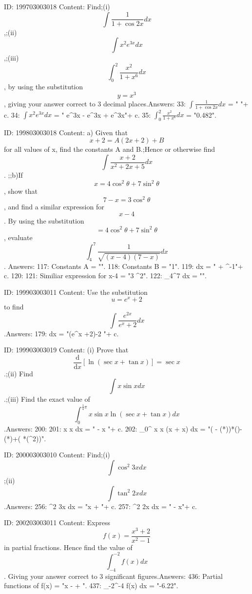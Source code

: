 \documentclass{article}
\begin{document}
ID: 199703003018
Content:
Find;(i) \[\int \frac {1}{1 + \cos 2x} dx\],;(ii) \[\int x^{2} e^{3x} dx\],;(iii)\[\int_{0}^{2} \frac {x^{2}}{1 + x^{6}} dx\], by using the substitution \[y = x^{3}\], giving your answer correct to 3 decimal places.Answers:
33: $\int \frac{1}{1+\cos 2x} dx$ = " "+ c.
34: $\int x^2 e^{3x} dx$ = " e^{3x} -  e^{3x} +  e^{3x}"+ c.
35: $\int_0^2 \frac{x^2}{1+x^6} dx$ = "0.482".

ID: 199803003018
Content:
a)  Given that $$x + 2 = A (2x + 2) + B$$ for all values of x, find the constants A and B.;Hence or otherwise find $$\int \frac{x + 2}{x^2 + 2x + 5} dx$$. ;;b)If  $$x = 4 {\cos}^2 \theta + 7 {\sin}^2 \theta$$, show that $$7 - x = 3 {\cos}^2 \theta$$, and find a similar expression for $$x - 4$$. By using the substitution $$= 4 {\cos}^2 \theta + 7 {\sin}^2 \theta$$, evaluate $$\int^7_4 \frac{1}{\sqrt{{ ( x - 4 ) ( 7 - x ) }}} dx$$. Answers:
117: Constants A = "".
118: Constants B = "1".
119: \int {} dx = "  +  \tan^{-1}{}"+ c.
120: 
121: Similiar expression for x-4 = "3 \sin^{2}{\theta}".
122: \int_4^7  dx = "\pi".

ID: 199903003011
Content:
Use the substitution \[u = e^x + 2\] to find \[\int \frac {e^{2x}}{e^x + 2} dx\].Answers:
179: \int {} dx = "(e^x +2)-2 "+ c.

ID: 199903003019
Content:
(i) Prove that \[\frac{\mathrm{d} }{\mathrm{d} x} [\ln (\sec x + \tan x)] = \sec x\].;(ii) Find \[\int x\sin x dx\].;(iii) Find the exact value of \[\int_{0}^{\frac {1}{4} \pi} x\sin x\ln(\sec x + \tan x) dx\].Answers:
200: 
201: \int x \sin x dx = " - x "+ c.
202: \int_0^{\pi} x \sin x \ln (\sec x + \tan x) dx = "( - (*\pi))*()-(*)+( *(\pi^2))".

ID: 200003003010
Content:
Find;(i) \[\int \cos^2 3x dx\] ;(ii) \[\int \tan^2 2x dx\].Answers:
256: \int \cos^2 3x dx = "x +  "+ c.
257: \int \tan^2 2x dx = "  - x"+ c.

ID: 200203003011
Content:
Express  $$f(x) = \frac{x^3+2}{x^2-1}$$ in partial fractions. Hence find the value of  $$\int_{-4}^{-2} f(x)dx $$. Giving your answer correct to 3 significant figures.Answers:
436: Partial functions of f(x) = "x -  + ".
437: \int_{-2}^{-4} f(x) dx = "-6.22".
\end{document}
